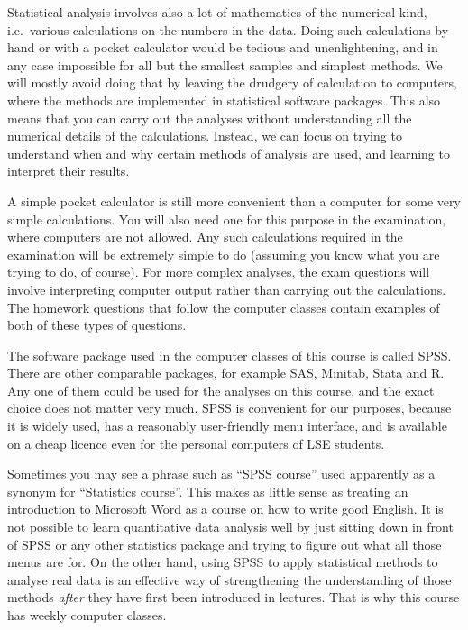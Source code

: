 Statistical analysis involves also a lot of mathematics of the numerical
kind, i.e.\ various calculations on the numbers in the data. Doing such
calculations by hand or with a pocket calculator would be tedious and
unenlightening, and in any case impossible for all but the smallest
samples and simplest methods. We will mostly avoid doing that by leaving
the drudgery of calculation to computers, where the methods are
implemented in statistical software packages. This also means that you
can carry out the analyses without understanding all the numerical
details of the calculations. Instead, we can focus on trying to
understand when and why certain methods of analysis are used, and
learning to interpret their results.

A simple pocket calculator is still more convenient than a
computer for some very simple calculations. You will also need one for
this purpose in the examination, where computers are not allowed. Any
such calculations required in the examination will be extremely simple
to do (assuming you know what you are trying to do, of course). For more
complex analyses, the exam questions will involve interpreting computer
output rather than carrying out the calculations. The homework questions
that follow the computer classes contain examples of both of these types of
questions.

The software package used in the computer classes of this course is
called SPSS. There are other comparable packages, for
example SAS, Minitab, Stata and R. Any one of them could be used for the
analyses on this course, and the exact choice does not matter very much.
SPSS is convenient for our purposes, because it is widely used,
has a reasonably user-friendly menu interface, and is available on a
cheap licence even for the personal computers of LSE students.

Sometimes you may see a phrase such as ``SPSS course'' used apparently
as a synonym for ``Statistics course''. This makes as little sense as
treating an introduction to Microsoft Word as a course on how to write
good English. It is not possible to learn quantitative data analysis
well by just sitting down in front of SPSS or any other statistics
package and trying to figure out what all those menus are for. On the
other hand, using SPSS to apply statistical methods to analyse real data
is an effective way of strengthening the understanding of
those methods \emph{after} they have first been introduced in lectures.
That is why this course has weekly computer classes.

